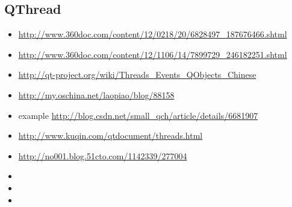 \documentclass[9pt,b5paper]{article}
\begin{document}
\subsection{QThread}
\label{sec-16-22}
\begin{itemize}
\item \url{http://www.360doc.com/content/12/0218/20/6828497_187676466.shtml}
\item \url{http://www.360doc.com/content/12/1106/14/7899729_246182251.shtml}
\item \url{http://qt-project.org/wiki/Threads_Events_QObjects_Chinese}
\item \url{http://my.oschina.net/laopiao/blog/88158}
\item example \url{http://blog.csdn.net/small_qch/article/details/6681907}
\item \url{http://www.kuqin.com/qtdocument/threads.html}
\item \url{http://no001.blog.51cto.com/1142339/277004}
\item 
\item 
\item 
\end{itemize}
\end{document}
